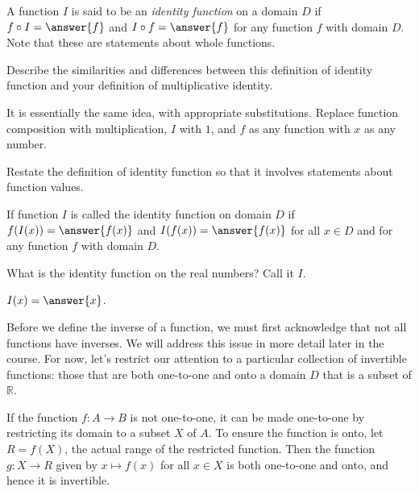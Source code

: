\documentclass{ximera}
\begin{document}
\begin{definition}
A function $I$ is said to be an \emph{identity function} on a domain $D$ if $f\circ I=\answer{f}$ and $I\circ f = \answer{f}$ for any function $f$ with domain $D$.  Note that these are statements about whole functions.  
\end{definition}

\begin{question}
Describe the similarities and differences between this definition of identity function and your definition of multiplicative identity.  
\begin{freeResponse}
\begin{hint}
It is essentially the same idea, with appropriate substitutions.  Replace function composition with multiplication, $I$ with $1$, and $f$ as any function with $x$ as any number.  
\end{hint}
\end{freeResponse}
\end{question}

\begin{question}
Restate the definition of identity function so that it involves statements about function values.  
\begin{freeResponse}
\begin{hint}
If function $I$ is called the identity function on domain $D$ if $f(I(x)) = \answer{f(x)}$ and $I(f(x))=\answer{f(x)}$ for all $x\in D$ and for any function $f$ with domain $D$.  
\end{hint}
\end{freeResponse}
\end{question}

\begin{question}
What is the identity function on the real numbers?  Call it $I$.  

$I(x)=\answer{x}$.
\end{question}

Before we define the inverse of a function, we must first acknowledge that not all functions have inverses.  We will address this  issue in more detail later in the course.  For now, let's restrict our attention to a particular collection of invertible functions: those that are both one-to-one and onto a domain $D$ that is a subset of $\mathbb R$.  

\begin{remark}
If the function $f:A\rightarrow B$ is not one-to-one, it can be made one-to-one by restricting its domain to a subset $X$ of $A$.  To ensure the function is onto, let $R=f(X)$, the actual range of the restricted function.  Then the function $g:X\rightarrow R$ given by $x\mapsto f(x)$ for all $x\in X$ is both one-to-one and onto, and hence it is invertible.  
\end{remark}
\end{document}
